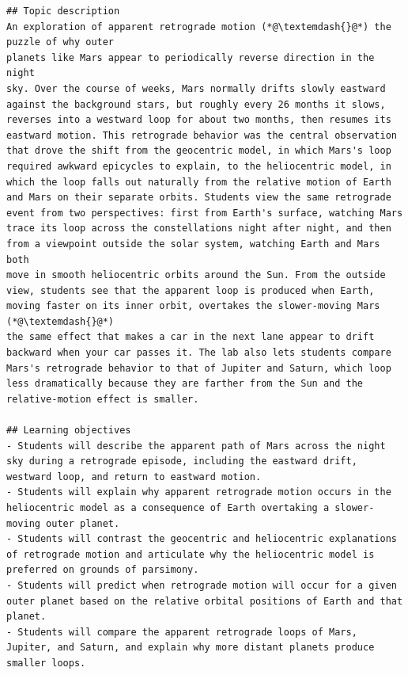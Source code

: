 \begin{lstlisting}[style=arlemlisting, caption={Complete Script-level JSON Lab input for \emph{Apparent Retrograde Motion}: system prompt, then user prompt.}, label={lst:example-prompt}]
## Topic description
An exploration of apparent retrograde motion (*@\textemdash{}@*) the puzzle of why outer
planets like Mars appear to periodically reverse direction in the night
sky. Over the course of weeks, Mars normally drifts slowly eastward
against the background stars, but roughly every 26 months it slows,
reverses into a westward loop for about two months, then resumes its
eastward motion. This retrograde behavior was the central observation
that drove the shift from the geocentric model, in which Mars's loop
required awkward epicycles to explain, to the heliocentric model, in
which the loop falls out naturally from the relative motion of Earth
and Mars on their separate orbits. Students view the same retrograde
event from two perspectives: first from Earth's surface, watching Mars
trace its loop across the constellations night after night, and then
from a viewpoint outside the solar system, watching Earth and Mars both
move in smooth heliocentric orbits around the Sun. From the outside
view, students see that the apparent loop is produced when Earth,
moving faster on its inner orbit, overtakes the slower-moving Mars (*@\textemdash{}@*)
the same effect that makes a car in the next lane appear to drift
backward when your car passes it. The lab also lets students compare
Mars's retrograde behavior to that of Jupiter and Saturn, which loop
less dramatically because they are farther from the Sun and the
relative-motion effect is smaller.

## Learning objectives
- Students will describe the apparent path of Mars across the night sky during a retrograde episode, including the eastward drift, westward loop, and return to eastward motion.
- Students will explain why apparent retrograde motion occurs in the heliocentric model as a consequence of Earth overtaking a slower-moving outer planet.
- Students will contrast the geocentric and heliocentric explanations of retrograde motion and articulate why the heliocentric model is preferred on grounds of parsimony.
- Students will predict when retrograde motion will occur for a given outer planet based on the relative orbital positions of Earth and that planet.
- Students will compare the apparent retrograde loops of Mars, Jupiter, and Saturn, and explain why more distant planets produce smaller loops.


\end{lstlisting}
